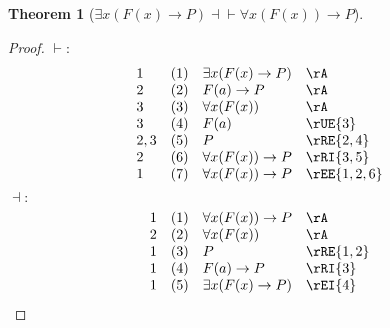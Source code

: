 \documentclass{book}
\theoremstyle{plain}
\newtheorem{theorem}{Theorem}
\theoremstyle{remark}
\theoremstyle{definition}
\begin{document}
\label{ExxLpFLpxRpToPRpEqvFaxLpFLpxRpRpToP}
\begin{theorem}[\(\exists x(F(x) \rightarrow P) \dashv \vdash \forall x(F(x)) \rightarrow P\)]
\end{theorem}
\begin{proof}
	\(\vdash:\)
	\[
	\begin{array}{llll}
		1 & (1) & \exists x(F(x) \rightarrow P) & \rA \\
		2 & (2) & F(a) \rightarrow P & \rA \\
		3 & (3) & \forall x(F(x)) & \rA \\
		3 & (4) & F(a) & \rUE{3} \\
		2,3 & (5) & P & \rRE{2,4} \\
		2 & (6) & \forall x(F(x)) \rightarrow P & \rRI{3,5} \\
		1 & (7) & \forall x(F(x)) \rightarrow P & \rEE{1,2,6} \\
	\end{array}
	\]
	\(\dashv:\)
	\[
	\begin{array}{llll}
		1 & (1) & \forall x(F(x)) \rightarrow P & \rA \\
		2 & (2) & \forall x(F(x)) & \rA \\
		1 & (3) & P & \rRE{1,2} \\
		1 & (4) & F(a) \rightarrow P & \rRI{3} \\
		1 & (5) & \exists x(F(x) \rightarrow P) & \rEI{4} \\
	\end{array}
	\]
\end{proof}
\end{document}
